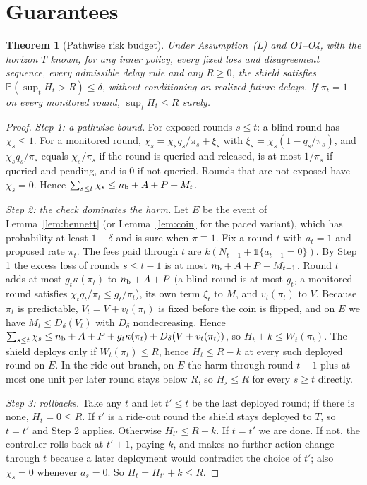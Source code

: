 \documentclass[10pt]{article}
\theoremstyle{plain}
\newtheorem{theorem}{Theorem}
\theoremstyle{definition}
\newcommand{\PP}{\mathbb{P}}
\newcommand{\one}{\mathds{1}}
\begin{document}
\section{Guarantees}\label{sec:theory}
\begin{samepage}
\begin{theorem}[Pathwise risk budget]\label{thm:main}
Under Assumption~(L) and O1--O4, with the horizon $T$ known, for any inner policy, every fixed loss and disagreement sequence, every admissible delay rule and any $R\ge0$, the shield satisfies $\PP(\sup_tH_t>R)\le\delta$, without conditioning on realized future delays. If $\pi_t=1$ on every monitored round, $\sup_tH_t\le R$ surely.
\end{theorem}
\end{samepage}
\begin{proof}
\emph{Step 1: a pathwise bound.} For exposed rounds $s\le t$: a blind round has $\chi_s\le1$. For a monitored round, $\chi_s=\chi_sq_s/\pi_s+\xi_s$ with $\xi_s=\chi_s(1-q_s/\pi_s)$, and $\chi_sq_s/\pi_s$ equals $\chi_s/\pi_s$ if the round is queried and released, is at most $1/\pi_s$ if queried and pending, and is $0$ if not queried. Rounds that are not exposed have $\chi_s=0$. Hence $\sum_{s\le t}\chi_s\le n_{\rm b}+A+P+M_t$.

\emph{Step 2: the check dominates the harm.} Let $E$ be the event of Lemma~\ref{lem:bennett} (or Lemma~\ref{lem:coin} for the paced variant), which has probability at least $1-\delta$ and is sure when $\pi\equiv1$. Fix a round $t$ with $a_t=1$ and proposed rate $\pi_t$. The fees paid through $t$ are $k(N_{t-1}+\one\{a_{t-1}=0\})$. By Step 1 the excess loss of rounds $s\le t-1$ is at most $n_{\rm b}+A+P+M_{t-1}$. Round $t$ adds at most $g_t\kappa(\pi_t)$ to $n_{\rm b}+A+P$ (a blind round is at most $g_t$, a monitored round satisfies $\chi_tq_t/\pi_t\le g_t/\pi_t$), its own term $\xi_t$ to $M$, and $v_t(\pi_t)$ to $V$. Because $\pi_t$ is predictable, $V_t=V+v_t(\pi_t)$ is fixed before the coin is flipped, and on $E$ we have $M_t\le D_\delta(V_t)$ with $D_\delta$ nondecreasing. Hence $\sum_{s\le t}\chi_s\le n_{\rm b}+A+P+g_t\kappa(\pi_t)+D_\delta(V+v_t(\pi_t))$, so $H_t+k\le W_t(\pi_t)$. The shield deploys only if $W_t(\pi_t)\le R$, hence $H_t\le R-k$ at every such deployed round on $E$. In the ride-out branch, on $E$ the harm through round $t-1$ plus at most one unit per later round stays below $R$, so $H_s\le R$ for every $s\ge t$ directly.

\emph{Step 3: rollbacks.} Take any $t$ and let $t'\le t$ be the last deployed round; if there is none, $H_t=0\le R$. If $t'$ is a ride-out round the shield stays deployed to $T$, so $t=t'$ and Step 2 applies. Otherwise $H_{t'}\le R-k$. If $t=t'$ we are done. If not, the controller rolls back at $t'+1$, paying $k$, and makes no further action change through $t$ because a later deployment would contradict the choice of $t'$; also $\chi_s=0$ whenever $a_s=0$. So $H_t=H_{t'}+k\le R$.


\end{proof}
\end{document}
